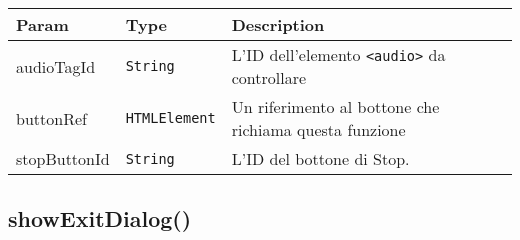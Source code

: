 \begin{tabularx}{\textwidth}{XXX}
\toprule
\begin{minipage}[b]{0.30\columnwidth}\raggedright
Param\strut
\end{minipage} & \begin{minipage}[b]{0.30\columnwidth}\raggedright
Type\strut
\end{minipage} & \begin{minipage}[b]{0.30\columnwidth}\raggedright
Description\strut
\end{minipage}\tabularnewline
\midrule
\endhead
\begin{minipage}[t]{0.30\columnwidth}\raggedright
audioTagId\strut
\end{minipage} & \begin{minipage}[t]{0.30\columnwidth}\raggedright
\texttt{String}\strut
\end{minipage} & \begin{minipage}[t]{0.30\columnwidth}\raggedright
L'ID dell'elemento \texttt{\textless{}audio\textgreater{}} da
controllare\strut
\end{minipage}\tabularnewline
\begin{minipage}[t]{0.30\columnwidth}\raggedright
buttonRef\strut
\end{minipage} & \begin{minipage}[t]{0.30\columnwidth}\raggedright
\texttt{HTMLElement}\strut
\end{minipage} & \begin{minipage}[t]{0.30\columnwidth}\raggedright
Un riferimento al bottone che richiama questa funzione\strut
\end{minipage}\tabularnewline
\begin{minipage}[t]{0.30\columnwidth}\raggedright
stopButtonId\strut
\end{minipage} & \begin{minipage}[t]{0.30\columnwidth}\raggedright
\texttt{String}\strut
\end{minipage} & \begin{minipage}[t]{0.30\columnwidth}\raggedright
L'ID del bottone di Stop.\strut
\end{minipage}\tabularnewline
\bottomrule
\end{tabularx}

\protect\hypertarget{showExitDialog}{}{}

\hypertarget{showexitdialog}{%
\subsection{showExitDialog()}\label{showexitdialog}}


